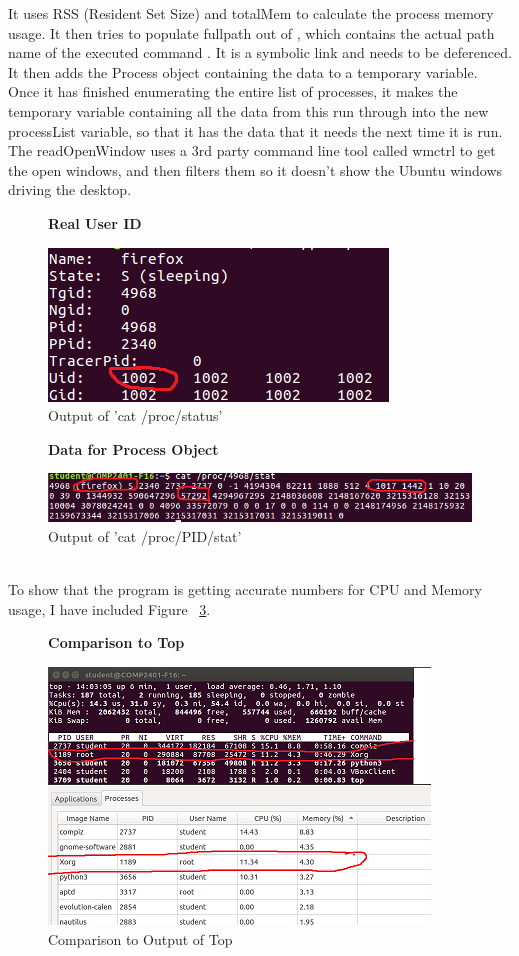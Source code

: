 \documentclass[12pt]{article}
\begin{document}
It uses RSS (Resident Set Size) and totalMem to calculate the process memory usage.
It then tries to populate fullpath out of , which contains the actual path name of the executed command \cite{manProc}. It is a symbolic link and needs to be deferenced. It then adds the Process object containing the data to a temporary variable. Once it has finished enumerating the entire list of processes, it makes the temporary variable containing all the data from this run through into the new processList variable, so that it has the data that it needs the next time it is run.\\
The readOpenWindow uses a 3rd party command line tool called wmctrl\cite{wmtrl} to get the open windows, and then filters them so it doesn't show the Ubuntu windows driving the desktop.
\begin{figure}[h]
	\centering
	\textbf{Real User ID}\par\medskip
	\includegraphics{realUid}
	\caption{Output of 'cat /proc/status'}
	\label{figRealUid}
\end{figure}
\begin{figure}[h]
	\textbf{Data for Process Object}\par\medskip
	\includegraphics{procPidStat}
	\caption{Output of 'cat /proc/PID/stat'}
	\label{figProcPidStat}
\end{figure}
\\To show that the program is getting accurate numbers for CPU and Memory usage, I have included Figure ~\ref{figCompare}.
\begin{figure}[h]
	\centering
	\textbf{Comparison to Top}\par\medskip
	\includegraphics{compareToTop}
	\caption{Comparison to Output of Top}
	\label{figCompare}
\end{figure}
\end{document}
